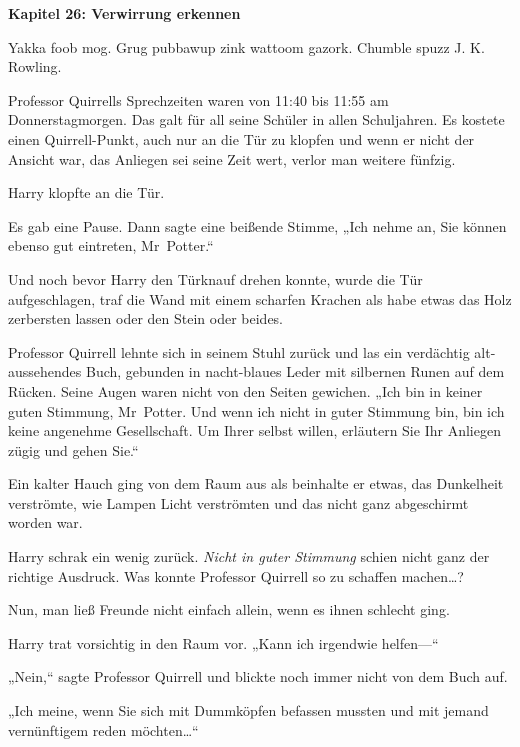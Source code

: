 

\hypertarget{verwirrung-erkennen}{%

\textbf{Kapitel 26: Verwirrung erkennen}

Yakka foob mog. Grug pubbawup zink wattoom gazork. Chumble spuzz J. K. Rowling.

\later

Professor Quirrells Sprechzeiten waren von 11:40 bis 11:55 am Donnerstagmorgen. Das galt für all seine Schüler in allen Schuljahren. Es kostete einen Quirrell-Punkt, auch nur an die Tür zu klopfen und wenn er nicht der Ansicht war, das Anliegen sei seine Zeit wert, verlor man weitere fünfzig.

Harry klopfte an die Tür.

Es gab eine Pause. Dann sagte eine beißende Stimme, „Ich nehme an, Sie können ebenso gut eintreten, Mr~Potter.“

Und noch bevor Harry den Türknauf drehen konnte, wurde die Tür aufgeschlagen, traf die Wand mit einem scharfen Krachen als habe etwas das Holz zerbersten lassen oder den Stein oder beides.

Professor Quirrell lehnte sich in seinem Stuhl zurück und las ein verdächtig alt-aussehendes Buch, gebunden in nacht-blaues Leder mit silbernen Runen auf dem Rücken. Seine Augen waren nicht von den Seiten gewichen. „Ich bin in keiner guten Stimmung, Mr~Potter. Und wenn ich nicht in guter Stimmung bin, bin ich keine angenehme Gesellschaft. Um Ihrer selbst willen, erläutern Sie Ihr Anliegen zügig und gehen Sie.“

Ein kalter Hauch ging von dem Raum aus als beinhalte er etwas, das Dunkelheit verströmte, wie Lampen Licht verströmten und das nicht ganz abgeschirmt worden war.

Harry schrak ein wenig zurück. \emph{Nicht in guter Stimmung} schien nicht ganz der richtige Ausdruck. Was konnte Professor Quirrell so zu schaffen machen…?

Nun, man ließ Freunde nicht einfach allein, wenn es ihnen schlecht ging.

Harry trat vorsichtig in den Raum vor. „Kann ich irgendwie helfen—“

„Nein,“ sagte Professor Quirrell und blickte noch immer nicht von dem Buch auf.

„Ich meine, wenn Sie sich mit Dummköpfen befassen mussten und mit jemand vernünftigem reden möchten…“

}
